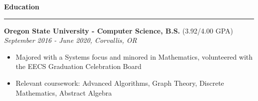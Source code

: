 \documentclass{article}
\def\hrulefill{\leavevmode\leaders\hrule height 1.2pt\hfill\kern\z}
\begin{document}
\vskip 0.1in

\noindent \large \textbf{Education } \hrulefill
\vskip 0.1in

\noindent \normalsize \textbf{Oregon State University - Computer Science, B.S.} \footnotesize (3.92/4.00 GPA) \hfill \small \textit{September 2016 - June 2020, Corvallis, OR}
\begin{itemize}
\item Majored with a Systems focus and minored in Mathematics, volunteered with the EECS Graduation Celebration Board
\item Relevant coursework: Advanced Algorithms, Graph Theory, Discrete Mathematics, Abstract Algebra
\end{itemize}
\end{document}
